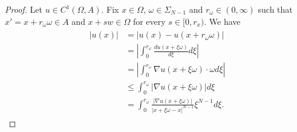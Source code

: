 \documentclass[11pt, a4paper]{article}
\numberwithin{equation}{section}
\newcommand{\abs}[1]{\left\lvert #1\right\rvert}
\begin{document}
  \begin{proof}
 Let $u\in C^{1}(\Omega,A)$. Fix $x\in \Omega$, $\omega\in \Sigma_{N-1}$ and $r_{\omega}\in(0,\infty)$ such that $x'=x+r_{\omega}\omega\in  A$ and $x+sw\in \Omega$ for every $s\in [0,r_{x})$. We have
 \begin{align}
   \label{az11}
   \begin{split}
     |u(x)|
   &=\abs{u(x)-u(x+r_{\omega}\omega)}\\
   &=\abs{\int_{0}^{r_{\omega}}\frac{du(x+\xi\omega)}{d\xi}d\xi}\\
   &= \abs{\int_{0}^{r_{\omega}}\nabla u(x+\xi\omega)\cdot \omega d\xi}\\
   &\le  \int_{0}^{r_{\omega}} \abs{\nabla
     u(x+\xi\omega)}d\xi\\
   &=\int_{0}^{r_{\omega}}\frac{|\nabla
  u(x+\xi\omega)|}{|x+\xi\omega -x|^{N-1}}\xi^{N-1}d\xi.
   \end{split}
\end{align}


\end{proof}
\end{document}
